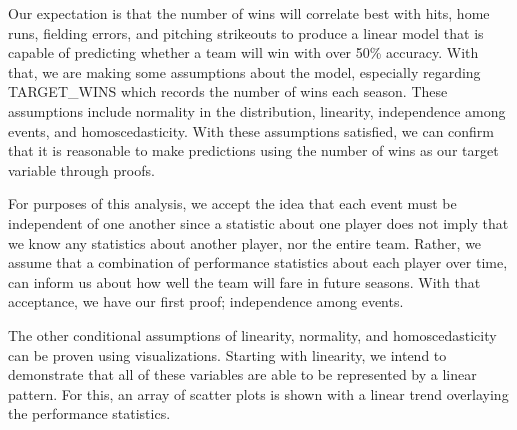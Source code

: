 \documentclass[
]{article}
\begin{document}
Our expectation is that the number of wins will correlate best with
hits, home runs, fielding errors, and pitching strikeouts to produce a
linear model that is capable of predicting whether a team will win with
over 50\% accuracy. With that, we are making some assumptions about the
model, especially regarding TARGET\_WINS which records the number of
wins each season. These assumptions include normality in the
distribution, linearity, independence among events, and
homoscedasticity. With these assumptions satisfied, we can confirm that
it is reasonable to make predictions using the number of wins as our
target variable through proofs.

For purposes of this analysis, we accept the idea that each event must
be independent of one another since a statistic about one player does
not imply that we know any statistics about another player, nor the
entire team. Rather, we assume that a combination of performance
statistics about each player over time, can inform us about how well the
team will fare in future seasons. With that acceptance, we have our
first proof; independence among events.

The other conditional assumptions of linearity, normality, and
homoscedasticity can be proven using visualizations. Starting with
linearity, we intend to demonstrate that all of these variables are able
to be represented by a linear pattern. For this, an array of scatter
plots is shown with a linear trend overlaying the performance
statistics.
\end{document}
